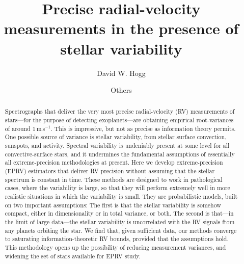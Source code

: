 \documentclass[modern]{aastex62}
\newcommand{\unit}[1]{\mathrm{#1}}
\newcommand{\m}{\unit{m}}
\newcommand{\s}{\unit{s}}
\newcommand{\ms}{\m\,\s^{-1}}
\begin{document}
\sloppy\sloppypar\raggedbottom\frenchspacing %
\graphicspath{ {figures/} }

\title{\textbf{Precise radial-velocity measurements in the presence of stellar variability}}

\author[0000-0003-2866-9403]{David W. Hogg}

\author{Others}

\begin{abstract}\noindent
Spectrographs that deliver the very most precise radial-velocity (RV)
measurements of stars---for the purpose of detecting exoplanets---are
obtaining empirical root-variances of around $1\,\ms$.
This is impressive, but not as precise as information theory
permits.
One possible source of variance is stellar variability, from stellar
surface convection, sunspots, and activity.
Spectral variability is undeniably present at some level for all
convective-surface stars, and it undermines the fundamental
assumptions of essentially all extreme-precision methodologies at
present.
Here we develop extreme-precision (EPRV) estimators that
deliver RV precision without assuming that the stellar spectrum is
constant in time.
These methods are designed to work in pathological cases, where the
variability is large, so that they will perform extremely well in more
realistic situations in which the variability is small.
They are probabilistic models, built on two important assumptions:
The first is that the stellar variability is somehow compact, either
in dimensionality or in total variance, or both.
The second is that---in the limit of large data---the stellar
variability is uncorrelated with the RV signals from any planets
orbiting the star.
We find that, given sufficient data, our methods converge to saturating
information-theoretic RV bounds, provided that the assumptions hold.
This methodology opens up the possibility of reducing measurement variances,
and widening the set of stars available for EPRV study.
\end{abstract}

\end{document}

